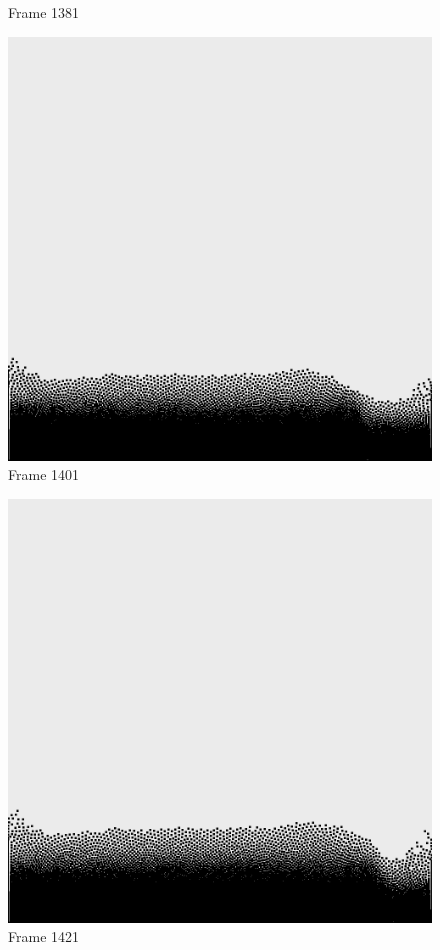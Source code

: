 \documentclass[a4paper, 12pt, oneside]{book}
\begin{document}
\begin{figure}[!ht]
\begin{center}
            Frame 1381
        \end{center}
    \endminipage
    \hfill
        \begin{center}
            \includegraphics[width=\linewidth]{images/test_case_2/1401.png}
            Frame 1401
        \end{center}
    \endminipage
    \hfill
        \begin{center}
            \includegraphics[width=\linewidth]{images/test_case_2/1421.png}
            Frame 1421
        \end{center}
    \endminipage
    \hfill


\end{figure}
\end{document}

